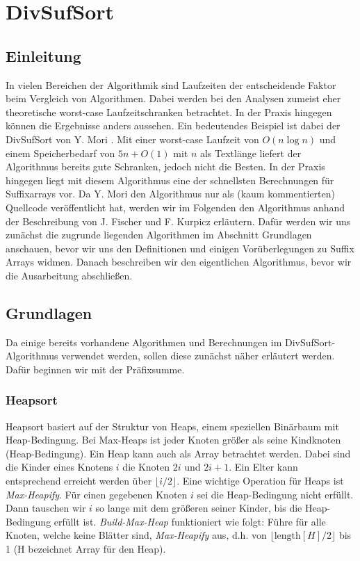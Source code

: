 \section{DivSufSort}

\subsection{Einleitung}
In  vielen Bereichen der Algorithmik sind Laufzeiten der entscheidende Faktor beim Vergleich von Algorithmen. Dabei werden bei den Analysen zumeist eher theoretische worst-case Laufzeitschranken betrachtet.
In der Praxis hingegen können die Ergebnisse anders aussehen. Ein bedeutendes Beispiel ist dabei der \glqq DivSufSort\grqq{} von Y. Mori \cite{saca:5:repo}. Mit einer worst-case Laufzeit von $O(n\log{n})$ und einem Speicherbedarf von $5n + O(1)$ mit $n$ als Textlänge liefert der Algorithmus bereits gute Schranken, jedoch nicht die Besten. In der Praxis hingegen liegt mit diesem Algorithmus eine der schnellsten Berechnungen für Suffixarrays vor. Da Y. Mori den Algorithmus nur als (kaum kommentierten) Quellcode veröffentlicht hat, werden wir im Folgenden den Algorithmus anhand der Beschreibung von J. Fischer und F. Kurpicz \cite{saca:5} erläutern. Dafür werden wir uns zunächst die zugrunde liegenden Algorithmen im Abschnitt Grundlagen anschauen, bevor wir uns den Definitionen und einigen Vorüberlegungen zu Suffix Arrays widmen. Danach beschreiben wir den eigentlichen Algorithmus, bevor wir die Ausarbeitung abschließen.

\iffalse
\subsection{Grundlagen}
Da einige bereits vorhandene Algorithmen und Berechnungen im DivSufSort-Algorithmus verwendet werden, sollen diese zunächst näher erläutert werden. Dafür beginnen wir mit der Präfixsumme.


\subsubsection{Heapsort}
Heapsort basiert auf der Struktur von Heaps, einem speziellen Binärbaum mit Heap-Bedingung. Bei Max-Heaps ist jeder Knoten größer als seine Kindknoten (Heap-Bedingung). Ein Heap kann auch als Array betrachtet werden. Dabei sind die Kinder eines Knotens $i$ die Knoten $2i$ und $2i + 1$. Ein Elter kann entsprechend erreicht werden über $\lfloor i/2 \rfloor$. Eine wichtige Operation für Heaps ist \textit{Max-Heapify}. Für einen gegebenen Knoten $i$ sei die Heap-Bedingung nicht erfüllt. Dann tauschen wir $i$ so lange mit dem größeren seiner Kinder, bis die Heap-Bedingung erfüllt ist. \textit{Build-Max-Heap} funktioniert wie folgt: Führe für alle Knoten, welche keine Blätter sind, \textit{Max-Heapify} aus, d.h. von $\lfloor \text{length}[H]/2\rfloor$ bis 1 (H bezeichnet Array für den Heap).

